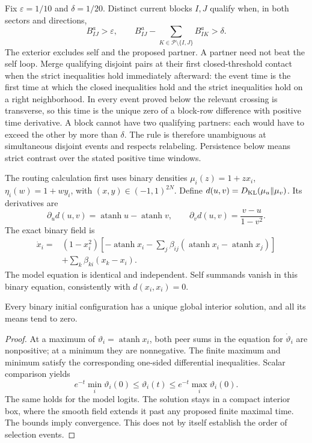 Fix $\varepsilon=1/10$ and $\delta=1/20$. Distinct current blocks $I,J$ qualify when, in both sectors and directions,
\begin{equation}
B^a_{IJ}>\varepsilon,
\qquad
B^a_{IJ}-\sum_{K\in\mathcal P\setminus\{I,J\}}B^a_{IK}>\delta.
\label{open:contrast}
\end{equation}
The exterior excludes self and the proposed partner. A partner need not beat the self loop. Merge qualifying disjoint pairs at their first closed-threshold contact when the strict inequalities hold immediately afterward: the event time is the first time at which the closed inequalities hold and the strict inequalities hold on a right neighborhood. In every event proved below the relevant crossing is transverse, so this time is the unique zero of a block-row difference with positive time derivative. A block cannot have two qualifying partners: each would have to exceed the other by more than $\delta$. The rule is therefore unambiguous at simultaneous disjoint events and respects relabeling. Persistence below means strict contrast over the stated positive time windows.

The routing calculation first uses binary densities $\mu_i(z)=1+zx_i$, $\eta_i(w)=1+wy_i$, with $(x,y)\in(-1,1)^{2N}$. Define $d(u,v)=D_{\mathrm{KL}}(\mu_u\|\mu_v)$. Its derivatives are
\begin{equation}
\partial_ud(u,v)=\operatorname{atanh}u-\operatorname{atanh}v,
\qquad
\partial_vd(u,v)=\frac{v-u}{1-v^2}.
\end{equation}
The exact binary field is
\begin{equation}
\begin{split}
\dot x_i={}&(1-x_i^2)\left[-\operatorname{atanh}x_i
-\sum_j\beta_{ij}(\operatorname{atanh}x_i-\operatorname{atanh}x_j)\right]\\
&+\sum_k\beta_{ki}(x_k-x_i).
\end{split}
\label{open:binary-field}
\end{equation}
The model equation is identical and independent. Self summands vanish in this binary equation, consistently with $d(x_i,x_i)=0$.

Every binary initial configuration has a unique global interior solution, and all its means tend to zero.
\begin{proof}
At a maximum of $\vartheta_i=\operatorname{atanh}x_i$, both peer sums in the equation for $\dot\vartheta_i$ are nonpositive; at a minimum they are nonnegative. The finite maximum and minimum satisfy the corresponding one-sided differential inequalities. Scalar comparison yields
\begin{equation}
e^{-t}\min_i\vartheta_i(0)\le\vartheta_i(t)
\le e^{-t}\max_i\vartheta_i(0).
\label{open:logit-bound}
\end{equation}
The same holds for the model logits. The solution stays in a compact interior box, where the smooth field extends it past any proposed finite maximal time. The bounds imply convergence. This does not by itself establish the order of selection events.
\end{proof}

